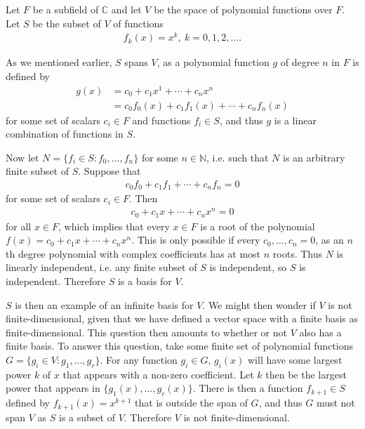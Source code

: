 \documentclass[12pt]{article}
\begin{document}
\begin{exm}
  Let $F$ be a subfield of $\mathbb{C}$ and let $V$ be the space of polynomial
  functions over $F$. Let $S$ be the subset of $V$ of functions
  \begin{align*}
    f_k(x) = x^k,\ k = 0,1,2,\ldots.
  \end{align*}

  As we mentioned earlier, $S$ spans $V$, as a polynomial function $g$ of degree $n$
  in $F$ is defined by
  \begin{align*}
    g(x) &= c_0 + c_1x^1 + \cdots + c_nx^n\\
    &= c_0f_0(x) + c_1f_1(x) + \cdots + c_nf_n(x)
  \end{align*}
  for some set of scalars $c_i \in F$ and functions $f_i \in S$, and thus $g$ is a
  linear combination of functions in
  $S$.

  Now let $N = \{f_i \in S: f_0,\ldots,f_n\}$ for some $n \in \mathbb{N}$, i.e. such
  that $N$ is an arbitrary finite subset of $S$. Suppose that
  \begin{align*}
    c_0f_0 + c_1f_1 + \cdots + c_nf_n = 0
  \end{align*}
  for some set of scalars $c_i \in F$. Then
  \begin{align*}
    c_0 + c_1x + \cdots + c_nx^n = 0
  \end{align*}
  for all $x \in F$, which implies that every $x \in F$ is a root of the polynomial
  $f(x) = c_0 + c_1x + \cdots + c_nx^n$. This is only possible if every
  $c_0,\ldots,c_n = 0$, as an $n$th degree polynomial with complex coefficients has
  at most $n$ roots. Thus $N$ is linearly independent, i.e. any finite subset of $S$
  is independent, so $S$ is independent. Therefore $S$ is a basis for $V$.

  $S$ is then an example of an infinite basis for $V$. We might then wonder if $V$ is
  not finite-dimensional, given that we have defined a vector space with a finite
  basis as finite-dimensional. This question then amounts to whether or not $V$ also
  has a finite basis. To answer this question, take some finite set of polynomial
  functions $G = \{g_i \in V: g_1,\ldots,g_r\}$. For any function $g_i \in G$,
  $g_i(x)$ will have some largest power $k$ of $x$ that appears with a non-zero
  coefficient.  Let $k$ then be the largest power that appears in
  $\{g_1(x),\ldots,g_r(x)\}$. There is then a function $f_{k+1} \in S$ defined by
  $f_{k+1}(x) = x^{k+1}$ that is outside the span of $G$, and thus $G$ must not span
  $V$ as $S$ is a subset of $V$.  Therefore $V$ is not finite-dimensional.
\end{exm}
\end{document}
